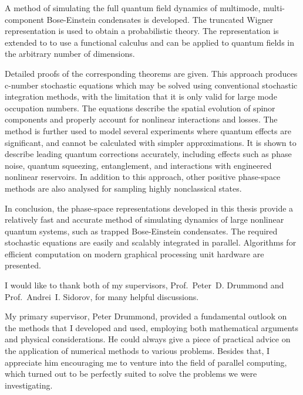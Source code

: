 

\cleardoublepage



A method of simulating the full quantum field dynamics of multimode, multi-component Bose-Einstein condensates is developed.
The truncated Wigner representation is used to obtain a probabilistic theory.
The representation is extended to to use a functional calculus and can be applied to quantum fields in the arbitrary number of dimensions.

Detailed proofs of the corresponding theorems are given.
This approach produces c-number stochastic equations which may be solved using conventional stochastic integration methods, with the limitation that it is only valid for large mode occupation numbers.
The equations describe the spatial evolution of spinor components and properly account for nonlinear interactions and losses.
The method is further used to model several experiments where quantum effects are significant, and cannot be calculated with simpler approximations.
It is shown to describe leading quantum corrections accurately, including effects such as phase noise, quantum squeezing, entanglement, and interactions with engineered nonlinear reservoirs.
In addition to this approach, other positive phase-space methods are also analysed for sampling highly nonclassical states.

In conclusion, the phase-space representations developed in this thesis provide a relatively fast and accurate method of simulating dynamics of large nonlinear quantum systems, such as trapped Bose-Einstein condensates.
The required stochastic equations are easily and scalably integrated in parallel.
Algorithms for efficient computation on modern graphical processing unit hardware are presented.


\cleardoublepage


I would like to thank both of my supervisors, Prof.~Peter~D. Drummond and Prof.~Andrei~I. Sidorov, for many helpful discussions.

My primary supervisor, Peter Drummond, provided a fundamental outlook on the methods that I developed and used, employing both mathematical arguments and physical considerations.
He could always give a piece of practical advice on the application of numerical methods to various problems.
Besides that, I appreciate him encouraging me to venture into the field of parallel computing, which turned out to be perfectly suited to solve the problems we were investigating.

